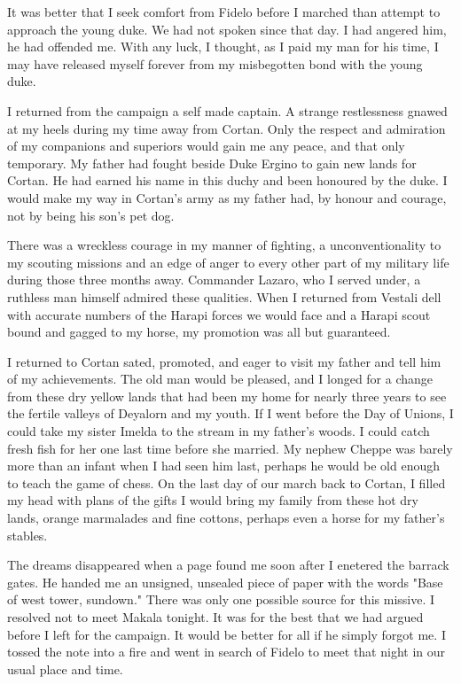 \documentclass{article}
\begin{document}
It was better that I seek comfort from Fidelo before I marched than attempt to approach the young duke. We had not spoken since that day. I had angered him, he had offended me. With any luck, I thought, as I paid my man for his time, I may have released myself forever from my misbegotten bond with the young duke.

\vspace{.5cm}

I returned from the campaign a self made captain. A strange restlessness gnawed at my heels during my time away from Cortan. Only the respect and admiration of my companions and superiors would gain me any peace, and that only temporary. My father had fought beside Duke Ergino to gain new lands for Cortan. He had earned his name in this duchy and been honoured by the duke. I would make my way in Cortan's army as my father had, by honour and courage, not by being his son's pet dog. 

There was a wreckless courage in my manner of fighting, a unconventionality to my scouting missions and an edge of anger to every other part of my military life during those three months away. Commander Lazaro, who I served under, a ruthless man himself admired these qualities. When I returned from Vestali dell with accurate numbers of the Harapi forces we would face and a Harapi scout bound and gagged to my horse, my promotion was all but guaranteed.

I returned to Cortan sated, promoted, and eager to visit my father and tell him of my achievements. The old man would be pleased, and I longed for a change from these dry yellow lands that had been my home for nearly three years to see the fertile valleys of Deyalorn and my youth. If I went before the Day of Unions, I could take my sister Imelda to the stream in my father's woods. I could catch fresh fish for her one last time before she married. My nephew Cheppe was barely more than an infant when I had seen him last, perhaps he would be old enough to teach the game of chess. On the last day of our march back to Cortan, I filled my head with plans of the gifts I would bring my family from these hot dry lands, orange marmalades and fine cottons, perhaps even a horse for my father's stables. 

The dreams disappeared when a page found me soon after I enetered the barrack gates. He handed me an unsigned, unsealed piece of paper with the words "Base of west tower, sundown." There was only one possible source for this missive. I resolved not to meet Makala tonight. It was for the best that we had argued before I left for the campaign. It would be better for all if he simply forgot me. I tossed the note into a fire and went in search of Fidelo to meet that night in our usual place and time. 
\end{document}
